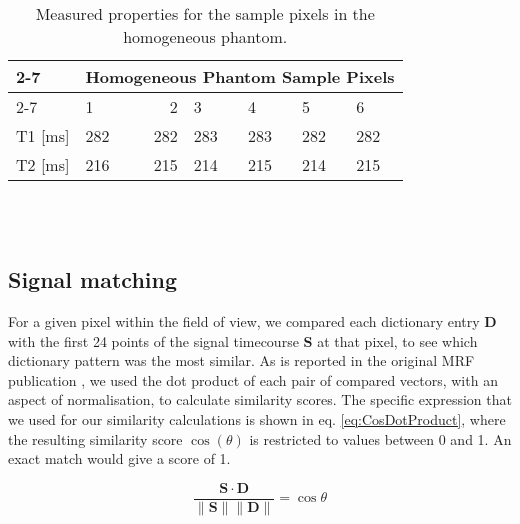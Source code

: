 \documentclass[journal]{IEEEtran}
\newcommand{\norm}[1]{\lVert#1\rVert}
\begin{document}
\begin{table}[]
\centering
\
\begin{tabular}{|l|l|r|l|l|l|l|}
\cline{2-7}
\multicolumn{1}{c|} {\multirow{2}{*}{}} & \multicolumn{6}{l|}{\cellcolor[HTML]{EFEFEF} Homogeneous Phantom Sample Pixels} \\ \cline{2-7} 
\multicolumn{1}{c|}{} & 1 & 2 & 3 & 4 & 5 & 6 \\ \hline
T1 [ms]& 282 & 282 & 283 & 283 & 282 & 282 \\ \hline
T2 [ms] &  216& 215 & 214 & 215  & 214 &  215\\ \hline
\end{tabular}
\\\
\caption{Measured properties for the sample pixels in the homogeneous phantom.}
\label{table:homogeneousPhantomMeasurements}
\end{table}

\subsection{Signal matching} 
For a given pixel within the field of view, we compared each dictionary entry $\boldsymbol{D}$ with the first 24 points of the signal timecourse $\boldsymbol{S}$ at that pixel, to see which dictionary pattern was the most similar. 
As is reported in the original MRF publication \cite{ma2013magnetic}, we used the dot product of each pair of compared vectors, with an aspect of normalisation, to calculate similarity scores. The specific expression that we used for our similarity calculations is shown in eq. \ref{eq:CosDotProduct}, where the resulting similarity score $\cos(\theta)$ is restricted to values between 0 and 1. An exact match would give a score of 1. 

\begin{equation} \label{eq:CosDotProduct}
\frac{\boldsymbol{S}\cdot \boldsymbol{D}} {\norm{\boldsymbol{S}} \norm{\boldsymbol{D}}} = \cos{\theta} 
\end{equation}
\end{document}
